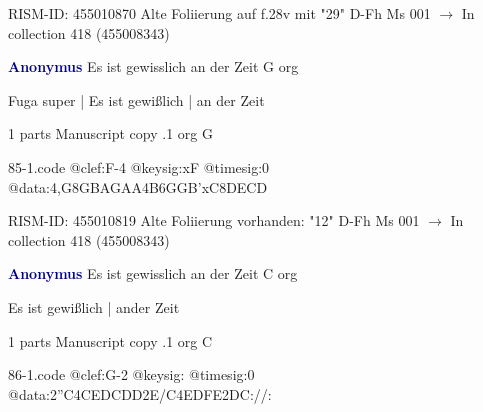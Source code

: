 \documentclass[twocolumn]{book}
\begin{document}
\newline RISM-ID: 455010870
\newline Alte Foliierung auf f.28v mit "29"
\newline D-Fh  Ms 001
\newline $\rightarrow$ In collection 418 (455008343)

\newline \par \vspace{7pt} \textcolor{darkblue}{\textbf{Anonymus  }}
\newline Es ist gewisslich an der Zeit  G  
\newline org
\newline \begin{itshape}[f.11v, at left:] Fuga super | Es ist gewißlich | an der Zeit\end{itshape} 
\newline \textcolor{darkblue}{}  1 parts  
\newline Manuscript copy
.1  org  G  
\begin{filecontents*}{85-1.code}
@clef:F-4
@keysig:xF
@timesig:0
@data:4,G{8GB}{AGAA}4B{6GGB'xC}{8DECD}
\end{filecontents*}
\newline
%

\newline RISM-ID: 455010819
\newline Alte Foliierung vorhanden: "12"
\newline D-Fh  Ms 001
\newline $\rightarrow$ In collection 418 (455008343)

\newline \par \vspace{7pt} \textcolor{darkblue}{\textbf{Anonymus  }}
\newline Es ist gewisslich an der Zeit  C  
\newline org
\newline \begin{itshape}[f.22v, at left:] Es ist gewißlich | ander Zeit\end{itshape} 
\newline \textcolor{darkblue}{}  1 parts  
\newline Manuscript copy
.1  org  C  
\begin{filecontents*}{86-1.code}
@clef:G-2
@keysig:
@timesig:0
@data:2''C4CEDCDD2E/C4EDFE2DC://:
\end{filecontents*}
\newline
%
\end{document}

